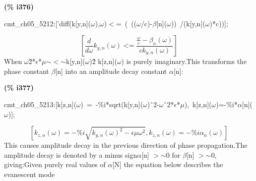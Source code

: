 \documentclass[fleqn]{article}
\begin{document}
\noindent
\begin{minipage}[t]{4.000000em}\color{red}\bfseries
(\% i376)	
\end{minipage}
\begin{minipage}[t]{\textwidth}\color{blue}
cmt\_ch05\_5212:['diff(k[y,n](\ensuremath{\omega}),\ensuremath{\omega})\ensuremath{<}=\ (\ ((\ensuremath{\omega}/c)-\ensuremath{\beta}[n](\ensuremath{\omega}))\ /(k[y,n](\ensuremath{\omega})*c))];
\end{minipage}
\[\displaystyle \tag{\% o376} 
\left[ \frac{d}{d \omega } {k_{y,n}}\left( \omega \right) \operatorname{<  =}\frac{\frac{\omega }{c}-{{\beta }_n}\left( \omega \right) }{c {k_{y,n}}\left( \omega \right) }\right] \mbox{}
\]
When \ensuremath{\omega}\^ 2*\ensuremath{\epsilon}*\ensuremath{\mu}\ensuremath{\sim }\ensuremath{<}\ensuremath{\sim }k[y,n](\ensuremath{\omega})\^ 2 k[z,n](\ensuremath{\omega}) is purely imaginary.This transforms the phase constant \ensuremath{\beta}[n] into an amplitude decay constant \ensuremath{\alpha}[n]:



\noindent
\begin{minipage}[t]{4.000000em}\color{red}\bfseries
(\% i377)	
\end{minipage}
\begin{minipage}[t]{\textwidth}\color{blue}
cmt\_ch05\_5213:[k[z,n](\ensuremath{\omega})\ =\ -\%i*sqrt(k[y,n](\ensuremath{\omega})\^\ 2-\ensuremath{\omega}\^\ 2*\ensuremath{\epsilon}*\ensuremath{\mu}),\ k[z,n](\ensuremath{\omega})=-\%i*\ensuremath{\alpha}[n](\ensuremath{\omega})];
\end{minipage}
\[\displaystyle \tag{\% o377} 
\left[ {k_{z,n}}\left( \omega \right) =-\% i \sqrt{{{{k_{y,n}}\left( \omega \right) }^{2}}-\epsilon  \mu  {{\omega }^{2}}}\operatorname{,}{k_{z,n}}\left( \omega \right) =-\% i {{\alpha }_n}\left( \omega \right) \right] \mbox{}
\]
This causes amplitude decay in the previous  direction of phase propagation.The amplitude decay is denoted by a minus sign\ensuremath{\alpha}[n] \ensuremath{>}\ensuremath{\sim }0 for \ensuremath{\beta}[n] \ensuremath{>}\ensuremath{\sim }0, giving:Given purely real values of \ensuremath{\alpha}[N] the equation below describes the evanescent mode
\end{document}

